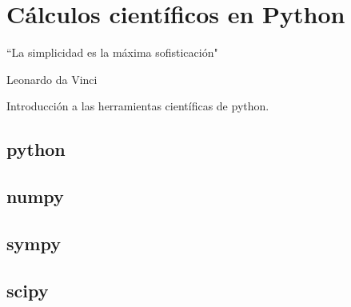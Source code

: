 \setchapterpreamble[u]{\margintoc}

\chapter{Cálculos científicos en Python} \label{chap:python}

\begin{kaobox}
	``La simplicidad es la máxima sofisticación"
	\begin{flushright}
		Leonardo da Vinci
	\end{flushright}
\end{kaobox}


Introducción a las herramientas científicas de python.

\section{python}

\section{numpy}

\section{sympy}

\section{scipy}